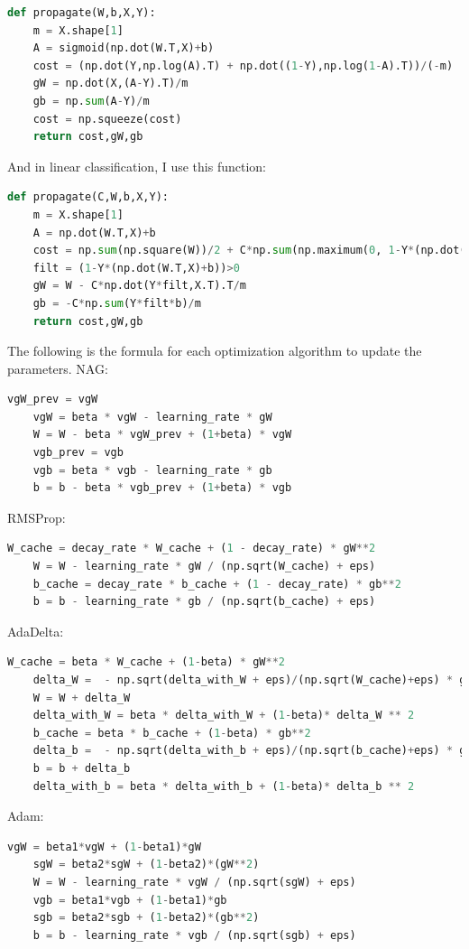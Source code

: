 \documentclass[journal, a4paper]{IEEEtran}
\begin{document}
\begin{lstlisting}[language=Python]
def propagate(W,b,X,Y):
    m = X.shape[1]
    A = sigmoid(np.dot(W.T,X)+b)
    cost = (np.dot(Y,np.log(A).T) + np.dot((1-Y),np.log(1-A).T))/(-m)
    gW = np.dot(X,(A-Y).T)/m  
    gb = np.sum(A-Y)/m
    cost = np.squeeze(cost)
    return cost,gW,gb
\end{lstlisting}
And in linear classification, I use this function:
\begin{lstlisting}[language=Python]
def propagate(C,W,b,X,Y):
    m = X.shape[1]
    A = np.dot(W.T,X)+b
    cost = np.sum(np.square(W))/2 + C*np.sum(np.maximum(0, 1-Y*(np.dot(W.T,X)+b)))/m
    filt = (1-Y*(np.dot(W.T,X)+b))>0
    gW = W - C*np.dot(Y*filt,X.T).T/m
    gb = -C*np.sum(Y*filt*b)/m
    return cost,gW,gb
\end{lstlisting}

The following is the formula for each optimization algorithm to update the parameters.
NAG:
\begin{lstlisting}[language=Python]
    vgW_prev = vgW
    vgW = beta * vgW - learning_rate * gW
    W = W - beta * vgW_prev + (1+beta) * vgW
    vgb_prev = vgb
    vgb = beta * vgb - learning_rate * gb
    b = b - beta * vgb_prev + (1+beta) * vgb
\end{lstlisting}
RMSProp:

\begin{lstlisting}[language=Python]
    W_cache = decay_rate * W_cache + (1 - decay_rate) * gW**2
    W = W - learning_rate * gW / (np.sqrt(W_cache) + eps)
    b_cache = decay_rate * b_cache + (1 - decay_rate) * gb**2
    b = b - learning_rate * gb / (np.sqrt(b_cache) + eps)
\end{lstlisting}
AdaDelta:

\begin{lstlisting}[language=Python]
    W_cache = beta * W_cache + (1-beta) * gW**2
    delta_W =  - np.sqrt(delta_with_W + eps)/(np.sqrt(W_cache)+eps) * gW
    W = W + delta_W
    delta_with_W = beta * delta_with_W + (1-beta)* delta_W ** 2
    b_cache = beta * b_cache + (1-beta) * gb**2
    delta_b =  - np.sqrt(delta_with_b + eps)/(np.sqrt(b_cache)+eps) * gb
    b = b + delta_b
    delta_with_b = beta * delta_with_b + (1-beta)* delta_b ** 2
\end{lstlisting}
Adam:

\begin{lstlisting}[language=Python]
    vgW = beta1*vgW + (1-beta1)*gW
    sgW = beta2*sgW + (1-beta2)*(gW**2)
    W = W - learning_rate * vgW / (np.sqrt(sgW) + eps)
    vgb = beta1*vgb + (1-beta1)*gb
    sgb = beta2*sgb + (1-beta2)*(gb**2)
    b = b - learning_rate * vgb / (np.sqrt(sgb) + eps)
\end{lstlisting}
\end{document}
